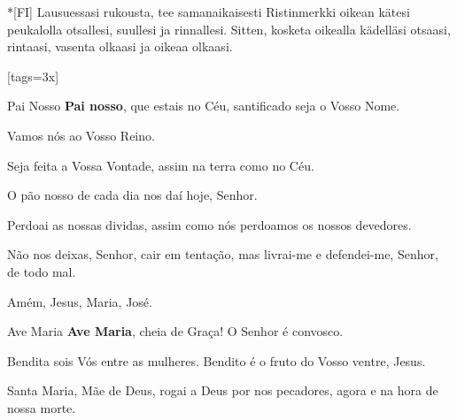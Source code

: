 \begin{songs}{}
        \vspace*{\fill}
        \begin{passage}*[FI]{}\obeylines
          Lausuessasi rukousta, tee samanaikaisesti
          Ristinmerkki oikean kätesi peukalolla
          otsallesi,
          suullesi ja
          rinnallesi.
          \polpar
          Sitten, kosketa oikealla kädelläsi
          otsaasi,
          rintaasi,
          vasenta olkaasi ja oikeaa olkaasi.
        \end{passage}
        \vspace*{\fill}
      \endsong
      \scleardpage
      [tags={3x}]
        \vspace*{6ex}
        \begin{passage}[PT]{Pai Nosso}
          \textbf{Pai nosso},
          que estais no Céu,
          santificado seja o Vosso Nome.
          \par
          Vamos nós ao Vosso Reino.
          \par
          Seja feita a Vossa Vontade,
          assim na terra como no Céu.
          \par
          O pão nosso de cada dia nos daí hoje, Senhor.
          \par
          Perdoai as nossas dividas,
          assim como nós perdoamos os nossos devedores.
          \par
          Não nos deixas, Senhor, cair em tentação,
          mas livrai-me e defendei-me, Senhor,
          de todo mal.
          \par
          Amém, Jesus, Maria, José.
        \end{passage}
        \begin{passage}[PT]{Ave Maria}
          \textbf{Ave Maria},
          cheia de Graça!
          O Senhor é convosco.
          \par
          Bendita sois Vós entre as mulheres.
          Bendito é o fruto do Vosso ventre, Jesus.
          \par
          Santa Maria, Mãe de Deus,
          rogai a Deus por nos pecadores,
          agora e na hora de nossa morte.
          \par

\end{passage}
\end{songs}
